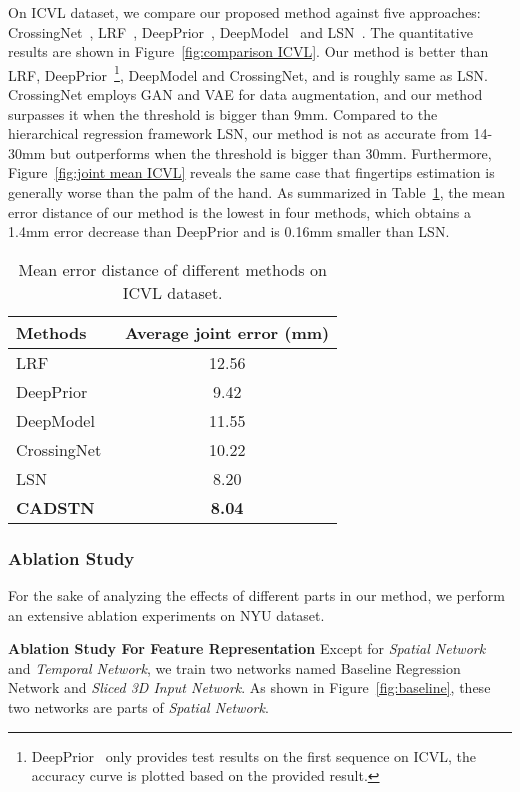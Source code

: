 \documentclass[journal,comsoc]{IEEEtran}
\let\MYoriglatexcaption\caption
\renewcommand{\caption}[2][\relax]{\MYoriglatexcaption[#2]{#2}}
\begin{document}
On ICVL dataset, we compare our proposed method against five approaches: CrossingNet~\cite{Wan_2017_CVPR}, LRF~\cite{tang2014latent},
DeepPrior~\cite{oberweger2015hands}, DeepModel~\cite{zhou2016model} and LSN~\cite{wan2016direction}. The quantitative results
are shown in Figure~\ref{fig:comparison ICVL}. Our method is better than LRF, DeepPrior~\footnote{DeepPrior~\cite{oberweger2015hands}
only provides test results on the first sequence on ICVL, the accuracy curve is plotted based on the provided result.}, DeepModel and
CrossingNet, and is roughly same as LSN. CrossingNet employs GAN and VAE for data augmentation, and our method surpasses it when the
threshold is bigger than 9mm. Compared to the hierarchical regression framework LSN, our method is not as accurate from 14-30mm
but outperforms when the threshold is bigger than 30mm. Furthermore, Figure~\ref{fig:joint mean ICVL} reveals the same case that
fingertips estimation is generally worse than the palm of the hand. As summarized in Table~\ref{tab:mean error ICVL}, the mean
error distance of our method is the lowest in four methods, which obtains a 1.4mm error decrease than DeepPrior and is 0.16mm smaller than LSN.
\begin{table}[htbp]
  \centering
  \caption{Mean error distance of different methods on ICVL dataset.}
    \begin{tabular}{|l|c|}\hline
    Methods & \multicolumn{1}{l|}{Average joint error (mm)} \\\hline
    LRF~\cite{tang2014latent}   &  12.56\\
    DeepPrior~\cite{oberweger2015hands} &  9.42\\
    DeepModel~\cite{zhou2016model} &  11.55\\
    CrossingNet~\cite{Wan_2017_CVPR} &10.22\\
    LSN~\cite{wan2016direction} & 8.20\\
    \textbf{CADSTN}  &\textbf{8.04}\\\hline
    \end{tabular}%
  \label{tab:mean error ICVL}%
\end{table}%
\subsubsection{Ablation Study}\label{sec:ablation}
For the sake of analyzing the effects of different parts in our method, we perform an extensive ablation experiments on NYU dataset.

\textbf{Ablation Study For Feature Representation}
Except for \emph{Spatial Network} and \emph{Temporal Network}, we train two networks named
{Baseline Regression Network} and \emph{Sliced 3D Input Network}. As shown in Figure~\ref{fig:baseline},
these two networks are parts of \emph{Spatial Network}.
\end{document}
